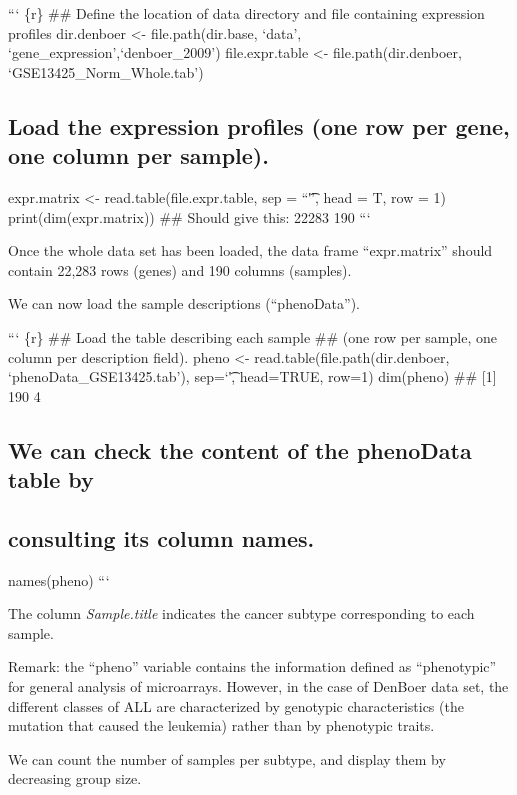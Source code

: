 ``` \{r\} \#\# Define the location of data directory and file containing
expression profiles dir.denboer \textless{}- file.path(dir.base, `data',
`gene\_expression',`denboer\_2009') file.expr.table \textless{}-
file.path(dir.denboer, `GSE13425\_Norm\_Whole.tab')

\subsection{Load the expression profiles (one row per gene, one column
per
sample).}\label{load-the-expression-profiles-one-row-per-gene-one-column-per-sample.}

expr.matrix \textless{}- read.table(file.expr.table, sep = ``\t'', head
= T, row = 1) print(dim(expr.matrix)) \#\# Should give this: 22283 190
```

Once the whole data set has been loaded, the data frame ``expr.matrix''
should contain 22,283 rows (genes) and 190 columns (samples).

We can now load the sample descriptions (``phenoData'').

``` \{r\} \#\# Load the table describing each sample \#\# (one row per
sample, one column per description field). pheno \textless{}-
read.table(file.path(dir.denboer, `phenoData\_GSE13425.tab'), sep=`\t',
head=TRUE, row=1) dim(pheno) \#\# {[}1{]} 190 4

\subsection{We can check the content of the phenoData table
by}\label{we-can-check-the-content-of-the-phenodata-table-by}

\subsection{consulting its column
names.}\label{consulting-its-column-names.}

names(pheno) ```

The column \emph{Sample.title} indicates the cancer subtype
corresponding to each sample.

Remark: the ``pheno'' variable contains the information defined as
``phenotypic'' for general analysis of microarrays. However, in the case
of DenBoer data set, the different classes of ALL are characterized by
genotypic characteristics (the mutation that caused the leukemia) rather
than by phenotypic traits.

We can count the number of samples per subtype, and display them by
decreasing group size.

